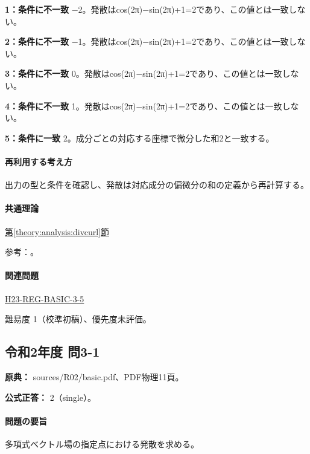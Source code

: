 \noindent\textbf{1：条件に不一致} −2。発散はcos(2π)−sin(2π)+1=\allowbreak{}2であり、この値とは一致しない。\par

\noindent\textbf{2：条件に不一致} −1。発散はcos(2π)−sin(2π)+1=\allowbreak{}2であり、この値とは一致しない。\par

\noindent\textbf{3：条件に不一致} 0。発散はcos(2π)−sin(2π)+1=\allowbreak{}2であり、この値とは一致しない。\par

\noindent\textbf{4：条件に不一致} 1。発散はcos(2π)−sin(2π)+1=\allowbreak{}2であり、この値とは一致しない。\par

\noindent\textbf{5：条件に一致} 2。成分ごとの対応する座標で微分した和2と一致する。\par

\paragraph{再利用する考え方} 出力の型と条件を確認し、発散は対応成分の偏微分の和の定義から再計算する。

\paragraph{共通理論} \hyperref[theory:analysis:divcurl]{第\ref*{theory:analysis:divcurl}節}

\par 参考：\cite{mit_vectorcalc2005}。

\paragraph{関連問題} \hyperref[q:h23-reg-basic-3-5]{H23-REG-BASIC-3-5}

\par 難易度 1（校準初稿）、優先度未評価。

\subsection{令和2年度 問3-1}
\label{q:r02-reg-basic-3-1}

\noindent\textbf{原典：} sources/R02/basic.pdf、PDF物理11頁。

\textbf{公式正答：} 2（single）。

\paragraph{問題の要旨} 多項式ベクトル場の指定点における発散を求める。

